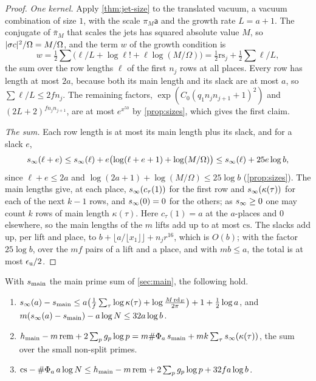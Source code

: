 \begin{proof}
\emph{One kernel.} Apply \cref{thm:jet-size} to the translated vacuum, a vacuum combination of size $1$, with the scale $\pi_M\mathsf a$ and the growth rate $L=a+1$. The conjugate of $\bar\pi_M$ that scales the jets has squared absolute value $M$, so $\lvert \sigma c\rvert^2/\Omega=M/\Omega$, and the term $w$ of the growth condition is
\[
  w=\tfrac12\sum\bigl(\ell/L+\log\ell!+\ell\log(M/\Omega)\bigr)=\tfrac12\mathrm{rs}_j+\tfrac12\sum\ell/L ,
\]
the sum over the row lengths $\ell$ of the first $n_j$ rows at all places. Every row has length at most $2a$, because both its main length and its slack are at most $a$, so $\sum\ell/L\le2fn_j$. The remaining factors, $\exp(C_0(q_1n_jn_{j+1}+1)^2)$ and $(2L+2)^{fn_jn_{j+1}}$, are at most $e^{x^{50}}$ by \cref{prop:sizes}, which gives the first claim.

\emph{The sum.} Each row length is at most its main length plus its slack, and for a slack $e$,
\[
  s_\infty(\ell+e)\le s_\infty(\ell)+e\bigl(\log(\ell+e+1)+\log(M/\Omega)\bigr)\le s_\infty(\ell)+25e\log b ,
\]
since $\ell+e\le2a$ and $\log(2a+1)+\log(M/\Omega)\le25\log b$ (\cref{prop:sizes}). The main lengths give, at each place, $s_\infty(c_\tau(1))$ for the first row and $s_\infty(\kappa(\tau))$ for each of the next $k-1$ rows, and $s_\infty(0)=0$ for the others; as $s_\infty\ge0$ one may count $k$ rows of main length $\kappa(\tau)$. Here $c_\tau(1)=a$ at the $a$-places and $0$
elsewhere, so the main lengths of the $m$ lifts add up to at most $\mathrm{cs}$. The slacks add up, per lift and place, to $b+\lfloor a/\lfloor x_1\rfloor\rfloor+n_jr^{16}$, which is $O(b)$; with the factor $25\log b$, over the $mf$ pairs of a lift and a place, and with $mb\le a$, the total is at most $\epsilon_{\mathrm{u}}/2$.
\end{proof}

\begin{proposition}\label{prop:level-pays}
With $s_{\rm main}$ the main prime sum of \cref{sec:main}, the following hold.
\begin{enumerate}[label=\textup{(\alph*)}]
\item $s_\infty(a)-s_{\rm main}\le a\bigl(\frac1f\sum_\tau\log\kappa(\tau)+\log\frac{M\,\mathrm{rd}_E}{2\pi}\bigr)+1+\frac12\log a$, and
$m(s_\infty(a)-s_{\rm main})-a\log N\le32a\log b$.
\item $h_{\mathrm{main}}-m\,\mathrm{rem}+2\sum_pg_p\log p=m\#\Phi_a\,s_{\rm main}+mk\sum_\tau s_\infty(\kappa(\tau))$, the sum over the small non-split primes.
\item $\mathrm{cs}-\#\Phi_a\,a\log N\le h_{\mathrm{main}}-m\,\mathrm{rem}+2\sum_pg_p\log p+32fa\log b$.
\end{enumerate}
\end{proposition}

